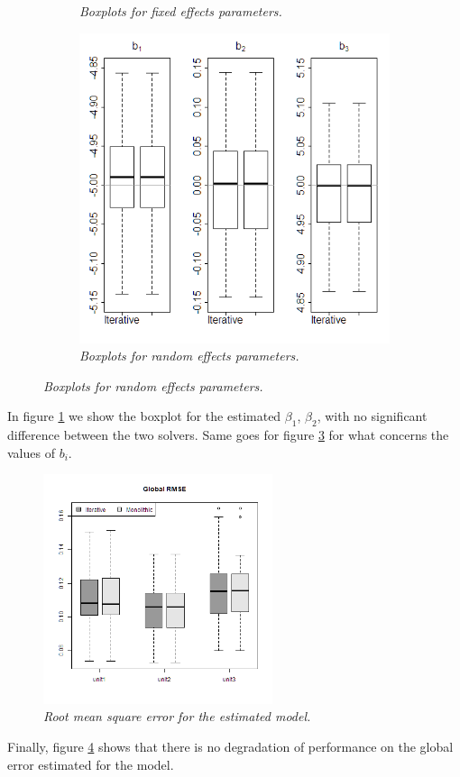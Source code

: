 \begin{figure}[t]
\begin{subfigure}{0.45\textwidth}
		\centering
		\caption{\textit{Boxplots for fixed effects parameters. }}
		\label{beta}
	\end{subfigure}
	\hfill
	\begin{subfigure}{0.45\textwidth}
		\includegraphics[width=\textwidth]{images/b.png}
		\centering
		\caption{\textit{Boxplots for random effects parameters.}}
		\label{b}
	\end{subfigure}
\end{figure}

In figure \ref{beta} we show the boxplot for the estimated $\beta_1$,
$\beta_2$, with no significant difference between the two solvers. Same goes
for figure \ref{b} for what concerns the values of $b_i$.

\begin{figure}[t]
	\includegraphics[width=0.6\textwidth]{images/rmse.png}
	\centering
	\caption{\textit{Root mean square error for the estimated model.}}
	\label{rmse}
\end{figure}
Finally, figure \ref{rmse} shows that there is no degradation of
performance on the global error estimated for the model.

